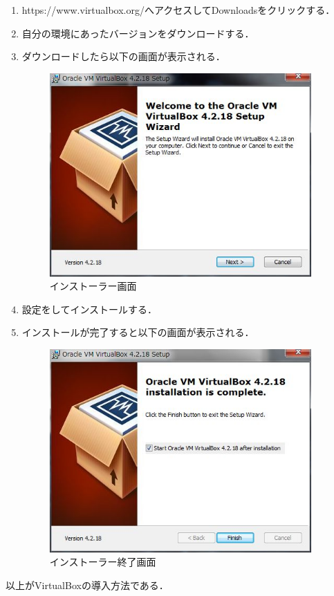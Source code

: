 \begin{enumerate}
\item https://www.virtualbox.org/へアクセスしてDownloadsをクリックする．
\item 自分の環境にあったバージョンをダウンロードする．
\item ダウンロードしたら以下の画面が表示される．
\begin{figure}[hb]
\centering
\includegraphics[width=10cm]{vm.png}
\caption{インストーラー画面}\label{vm.png}
\end{figure}
\item 設定をしてインストールする．
\item インストールが完了すると以下の画面が表示される．
\begin{figure}[hb]
\centering
\includegraphics[width=10cm]{arsuto.png}
\caption{インストーラー終了画面}\label{arsuto.png}
\end{figure}
\end{enumerate}

以上がVirtualBoxの導入方法である\cite{2017}．



